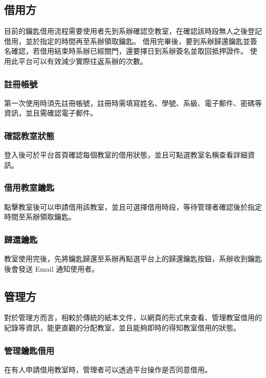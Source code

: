 \documentclass{article}
\begin{document}
\subsection{借用方}

目前的鑰匙借用流程需要使用者先到系辦確認空教室，在確認該時段無人之後登記借用，並於指定的時間再至系辦領取鑰匙。
借用完畢後，要到系辦歸還鑰匙並簽名確認，若借用結束時系辦已經關門，還要擇日到系辦簽名並取回抵押證件。
使用此平台可以有效減少實際往返系辦的次數。

\subsubsection{註冊帳號}

第一次使用時須先註冊帳號，註冊時需填寫姓名、學號、系級、電子郵件、密碼等資訊，並且需確認電子郵件。

\subsubsection{確認教室狀態}

登入後可於平台首頁確認每個教室的借用狀態，並且可點選教室名稱查看詳細資訊。

\subsubsection{借用教室鑰匙}

點擊教室後可以申請借用該教室，並且可選擇借用時段，等待管理者確認後於指定時間至系辦領取鑰匙。

\subsubsection{歸還鑰匙}

教室使用完後，先將鑰匙歸還至系辦再點選平台上的歸還鑰匙按鈕，系辦收到鑰匙後會發送 Email 通知使用者。

\subsection{管理方}

對於管理方而言，相較於傳統的紙本文件，以網頁的形式來查看、管理教室借用的紀錄等資訊，能更直觀的分配教室，並且能夠即時的得知教室借用的狀態。

\subsubsection{管理鑰匙借用}

在有人申請借用教室時，管理者可以透過平台操作是否同意借用。
\end{document}
